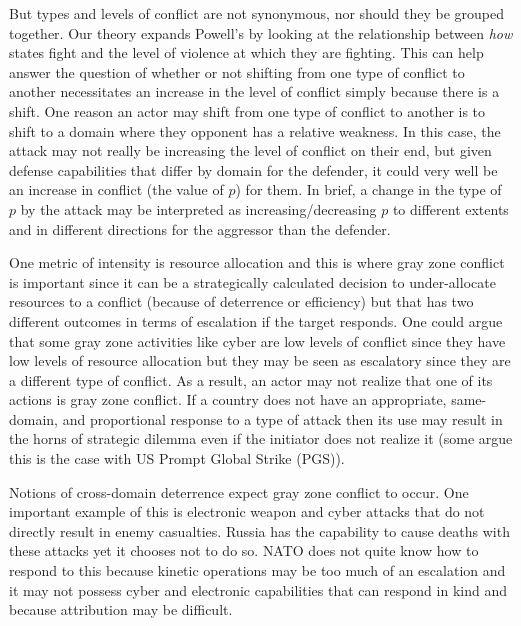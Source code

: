 \documentclass[12pt,letterpaper]{article}
\begin{document}
		But types and levels of conflict are not synonymous, nor should they be grouped together. Our theory expands Powell's by looking at the relationship between \textit{how} states fight and the level of violence at which they are fighting. This can help answer the question of whether or not shifting from one type of conflict to another necessitates an increase in the level of conflict simply because there is a shift. One reason an actor may shift from one type of conflict to another is to shift to a domain where they opponent has a relative weakness. In this case, the attack may not really be increasing the level of conflict on their end, but given defense capabilities that differ by domain for the defender, it could very well be an increase in conflict (the value of $p$) for them. In brief, a change in the type of $p$ by the attack may be interpreted as increasing/decreasing $p$ to different extents and in different directions for the aggressor than the defender.
				
		One metric of intensity is resource allocation and this is where gray zone conflict is important since it can be a strategically calculated decision to under-allocate resources to a conflict (because of deterrence or efficiency) but that has two different outcomes in terms of escalation if the target responds. One could argue that some gray zone activities like cyber are low levels of conflict since they have low levels of resource allocation but they may be seen as escalatory since they are a different type of conflict. As a result, an actor may not realize that one of its actions is gray zone conflict. If a country does not have an appropriate, same-domain, and proportional response to a type of attack then its use may result in the horns of strategic dilemma even if the initiator does not realize it (some argue this is the case with US Prompt Global Strike (PGS)).
				
		Notions of cross-domain deterrence expect gray zone conflict to occur. One important example of this is electronic weapon and cyber attacks that do not directly result in enemy casualties. Russia has the capability to cause deaths with these attacks yet it chooses not to do so. NATO does not quite know how to respond to this because kinetic operations may be too much of an escalation and it may not possess cyber and electronic capabilities that can respond in kind and because attribution may be difficult.
				
\end{document}
